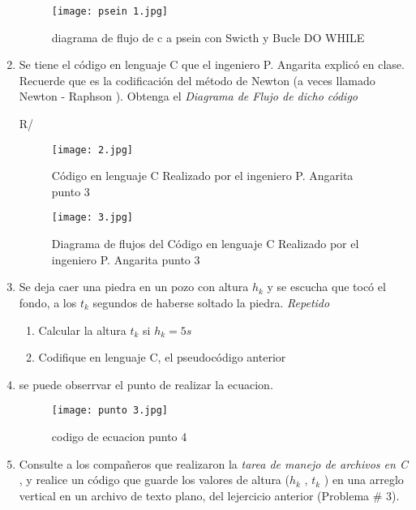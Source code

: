 \documentclass[ twoside,twocolumn,9pt, letterpape]{article}
\begin{document}
\begin{enumerate}
\begin{verbatim}
\end{verbatim}

\begin{figure}[h!]
\centering 
\texttt{[image: psein 1.jpg]}
\caption{diagrama de flujo de c a psein con Swicth y Bucle DO WHILE}
\label{Figura: 1}
\end{figure}


\item Se tiene el  código en lenguaje C que el ingeniero P. Angarita explicó en clase.
 Recuerde que es la codificación del método de Newton (a veces llamado Newton - Raphson ). Obtenga el {\it Diagrama de Flujo de dicho código}

R/

\begin{figure}[h!]
\centering 
\texttt{[image: 2.jpg]}
\caption{ Código en lenguaje C Realizado por el ingeniero P. Angarita
punto 3}
\label{imagen : 2 punto 3}
\end{figure}

\begin{figure}[h!]
\centering 
\texttt{[image: 3.jpg]}
\caption{ Diagrama de flujos del Código en lenguaje C Realizado por el ingeniero P. Angarita
punto 3}
\label{imagen: 3 punto 3}
\end{figure}

\item Se deja caer una piedra en un pozo con altura  $ h_{k}$ y se escucha que tocó el fondo, a los $t_k$ segundos de haberse soltado la piedra.  {\it Repetido}

\begin{enumerate}
\item Calcular la altura $t_{k}$ si $h_{k}= 5s$
\item  Codifique en lenguaje C, el pseudocódigo anterior 
\end{enumerate}

\item se puede obserrvar el punto de realizar la   ecuacion.

\begin{figure}[h!]
\centering 
\texttt{[image: punto 3.jpg]}
\caption{ codigo de ecuacion punto 4 }
\label{imagen: 4- punto 4}
\end{figure}



\item Consulte a los compañeros que realizaron la {\it tarea de manejo de archivos en C }, y realice un código que guarde los valores de altura ($h_{k}$ , $t_{k}$ ) en una arreglo vertical en un archivo de texto plano, del lejercicio anterior (Problema \# 3).\\



\end{enumerate}
\end{document}
